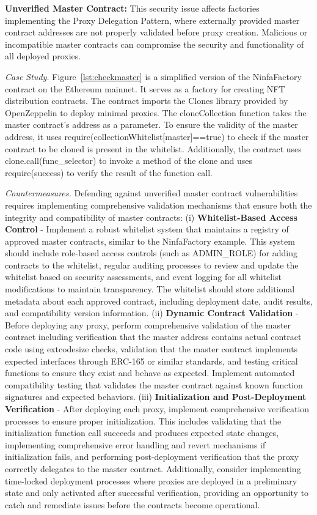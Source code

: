 \documentclass[acmsmall, screen]{acmart}
\begin{document}
	\textbf{Unverified Master Contract:} This security issue affects factories implementing the
	Proxy Delegation Pattern, where externally provided master contract addresses are not properly validated
	before proxy creation. Malicious or incompatible master contracts can compromise the security
	and functionality of all deployed proxies.

	\textit{Case Study.} Figure~\ref{lst:checkmaster} is a simplified version of the NinfaFactory contract
	on the Ethereum mainnet. It serves as a factory for creating NFT distribution contracts. The contract
	imports the Clones library provided by OpenZeppelin to deploy minimal proxies. The
	cloneCollection function takes the master contract's address as a parameter. To ensure the validity
	of the master address, it uses require(collectionWhitelist[master]==true) to check if the master
	contract to be cloned is present in the whitelist. Additionally, the contract uses clone.call(func\_selector)
	to invoke a method of the clone and uses require(success) to verify the result of the function call.

	\textit{Countermeasures.} Defending against unverified master contract vulnerabilities requires
	implementing comprehensive validation mechanisms that ensure both the integrity and
	compatibility of master contracts: (i) \textbf{Whitelist-Based Access Control} - Implement a
	robust whitelist system that maintains a registry of approved master contracts, similar to the NinfaFactory
	example. This system should include role-based access controls (such as ADMIN\_ROLE) for adding
	contracts to the whitelist, regular auditing processes to review and update the whitelist based on
	security assessments, and event logging for all whitelist modifications to maintain transparency.
	The whitelist should store additional metadata about each approved contract, including
	deployment date, audit results, and compatibility version information. (ii) \textbf{Dynamic
	Contract Validation} - Before deploying any proxy, perform comprehensive validation of the master
	contract including verification that the master address contains actual contract code using extcodesize
	checks, validation that the master contract implements expected interfaces through ERC-165 or
	similar standards, and testing critical functions to ensure they exist and behave as expected.
	Implement automated compatibility testing that validates the master contract against known
	function signatures and expected behaviors. (iii) \textbf{Initialization and Post-Deployment
	Verification} - After deploying each proxy, implement comprehensive verification processes to ensure
	proper initialization. This includes validating that the initialization function call succeeds
	and produces expected state changes, implementing comprehensive error handling and revert mechanisms
	if initialization fails, and performing post-deployment verification that the proxy correctly
	delegates to the master contract. Additionally, consider implementing time-locked deployment
	processes where proxies are deployed in a preliminary state and only activated after successful
	verification, providing an opportunity to catch and remediate issues before the contracts become
	operational.
\end{document}
